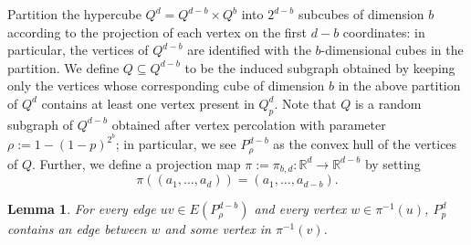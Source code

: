 \documentclass{article}
\newtheorem{lemma}[thm]{Lemma}
\theoremstyle{definition}
\newcommand{\eps}{\varepsilon}
\begin{document}
Partition the hypercube $Q^d = Q^{d-b}\times Q^b$ into $2^{d-b}$ subcubes of dimension $b$ according to the projection of each vertex on the first $d-b$ coordinates: in particular, the vertices of $Q^{d-b}$ are identified with the $b$-dimensional cubes in the partition.
We define $Q\subseteq Q^{d-b}$ to be the induced subgraph obtained by keeping only the vertices whose corresponding cube of dimension $b$ in the above partition of $Q^d$ contains at least one vertex present in $Q^d_p$. 
Note that $Q$ is a random subgraph of $Q^{d-b}$ obtained after vertex percolation with parameter $\rho := 1-(1-p)^{2^b}$; in particular, we see $P^{d-b}_{\rho}$ as the convex hull of the vertices of $Q$. 
Further, we define a projection map $\pi := \pi_{b,d}: \mathbb R^d\to \mathbb R^{d-b}$ by setting 
\[\pi((a_1,\ldots,a_d)) = (a_1,\ldots,a_{d-b}).\]
\begin{lemma}\label{lem:normalization}
For every edge $uv\in E(P^{d-b}_\rho)$ and every vertex $w\in \pi^{-1}(u)$, $P^d_p$ contains an edge between $w$ and some vertex in $\pi^{-1}(v)$.
\end{lemma}
\end{document}
